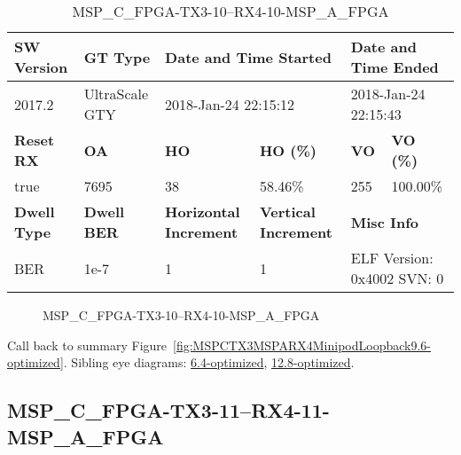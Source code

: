\begin{table}[h]
\centering
\caption{MSP\_C\_FPGA-TX3-10--RX4-10-MSP\_A\_FPGA}
\label{tab:MSPCFPGATX310RX410MSPAFPGA9.6-optimized}
\begin{tabular}{@{}|l|l|l|l|l|l|@{}}
\toprule
\textbf{SW Version}                & \textbf{GT Type}   & \multicolumn{2}{l|}{\textbf{Date and Time Started}}            & \multicolumn{2}{l|}{\textbf{Date and Time Ended}}        \\ \midrule
2017.2                       & UltraScale GTY          & \multicolumn{2}{l|}{2018-Jan-24 22:15:12}                   & \multicolumn{2}{l|}{2018-Jan-24 22:15:43}               \\ \midrule
\textbf{Reset RX}                  & \textbf{OA} & \textbf{HO}   & \textbf{HO (\%)} & \textbf{VO} & \textbf{VO (\%)} \\ \midrule
true & 7695        & 38          & 58.46\%        & 255        & 100.00\%       \\ \midrule
\textbf{Dwell Type}                & \textbf{Dwell BER} & \textbf{Horizontal Increment} & \textbf{Vertical Increment}    & \multicolumn{2}{l|}{\textbf{Misc Info}}                  \\ \midrule
BER                            & 1e-7        & 1        & 1           & \multicolumn{2}{l|}{ELF Version: 0x4002 SVN: 0}                         \\ \bottomrule
\end{tabular}
\end{table}

\begin{figure}[h]
\caption{MSP\_C\_FPGA-TX3-10--RX4-10-MSP\_A\_FPGA} \label{fig:MSPCFPGATX310RX410MSPAFPGA9.6-optimized}
\end{figure}

Call back to summary Figure~\ref{fig:MSPCTX3MSPARX4MinipodLoopback9.6-optimized}.
Sibling eye diagrams: \hyperref[sec:MSPCFPGATX310RX410MSPAFPGA6.4-optimized]{6.4-optimized}, \hyperref[sec:MSPCFPGATX310RX410MSPAFPGA12.8-optimized]{12.8-optimized}.

\clearpage
\newpage


\subsection{MSP\_C\_FPGA-TX3-11--RX4-11-MSP\_A\_FPGA}\label{sec:MSPCFPGATX311RX411MSPAFPGA9.6-optimized}

